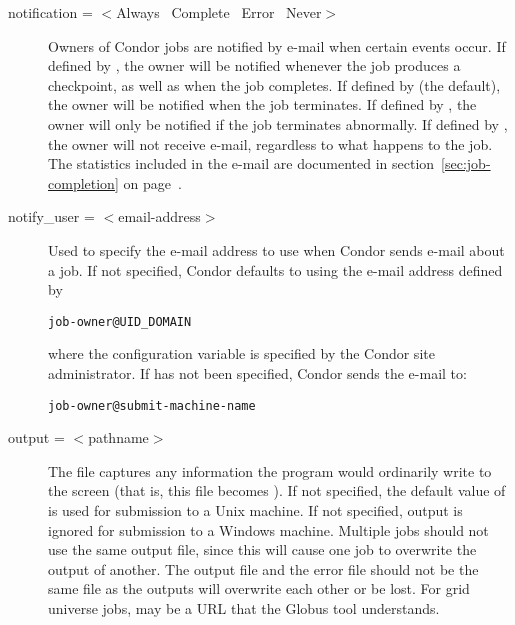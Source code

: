 \begin{description}

\label{man-condor-submit-notification}
\item[notification = $<$Always \Bar\ Complete \Bar\ Error \Bar\ Never$>$]
Owners of Condor jobs are notified by
e-mail when certain events occur.
If defined by , the owner will be notified
whenever the job produces a checkpoint, as well as when the job completes.
If defined by  (the default), the owner will
be notified when the job terminates.
If defined by , the owner will only be notified
if the job terminates abnormally.
If defined by , the owner will not receive e-mail,
regardless to what happens to the job.
The statistics included in the e-mail are documented in
section~\ref{sec:job-completion} on
page~\pageref{sec:job-completion}.


\item[notify\_user = $<$email-address$>$]
\label{man-condor-submit-notify-user}
Used to specify the e-mail
address to use when Condor sends e-mail about a job.  If not specified,
Condor defaults to using the e-mail address defined by
\begin{verbatim}
job-owner@UID_DOMAIN
\end{verbatim}
where the configuration variable 
is specified by the Condor site administrator.
If  has not been specified,
Condor sends the e-mail to:
\begin{verbatim}
job-owner@submit-machine-name
\end{verbatim}


\item[output = $<$pathname$>$]
\label{man-condor-submit-output}
The  file captures
any information the program would ordinarily write to the screen
(that is, this file becomes ).
If not specified, the default value of
 is used for submission to a Unix machine.
If not specified, output is ignored
for submission to a Windows machine.
Multiple jobs should not use the same output
file, since this will cause one job to overwrite the output of
another.
The output file and the error file should not be the same file
as the outputs will overwrite each other or be lost.
For grid universe jobs,  may be a URL that the Globus
tool  understands.


\end{description}
